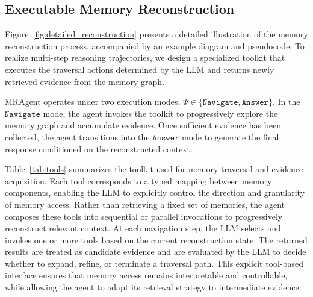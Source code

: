 \subsection{Executable Memory Reconstruction}
\label{app:reconstruction}
Figure~\ref{fig:detailed_reconstruction} presents a detailed illustration of the memory reconstruction process, accompanied by an example diagram and pseudocode.
To realize multi-step reasoning trajectories, we design a specialized toolkit that executes the traversal actions determined by the LLM and returns newly retrieved evidence from the memory graph.

MRAgent operates under two execution modes, $\Psi \in \{\mathtt{Navigate}, \mathtt{Answer}\}$.
In the $\mathtt{Navigate}$ mode, the agent invokes the toolkit to progressively explore the memory graph and accumulate evidence.
Once sufficient evidence has been collected, the agent transitions into the $\mathtt{Answer}$ mode to generate the final response conditioned on the reconstructed context.

Table~\ref{tab:tools} summarizes the toolkit used for memory traversal and evidence acquisition.
Each tool corresponds to a typed mapping between memory components, enabling the LLM to explicitly control the direction and granularity of memory access.
Rather than retrieving a fixed set of memories, the agent composes these tools into sequential or parallel invocations to progressively reconstruct relevant context.
At each navigation step, the LLM selects and invokes one or more tools based on the current reconstruction state.
The returned results are treated as candidate evidence and are evaluated by the LLM to decide whether to expand, refine, or terminate a traversal path.
This explicit tool-based interface ensures that memory access remains interpretable and controllable, while allowing the agent to adapt its retrieval strategy to intermediate evidence.



